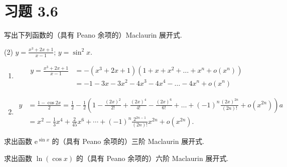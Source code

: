 \section{习题 3.6}

\begin{exercise}[3.6.1]
    写出下列函数的（具有 Peano 余项的）Maclaurin 展开式.
    \begin{tasks}(2)
        \task $y = \frac{x^3 + 2x + 1}{x - 1}$;
        \task $y = \sin^2 x$.
    \end{tasks}
\end{exercise}

\begin{solution}
    \begin{enumerate}
        \item \begin{align*}
                  y = \frac{x^3 + 2x + 1}{x - 1} & = -(x^3 + 2x + 1)(1 + x + x^2 + \dots + x^n + o(x^n))  \\
                                                 & = -1 - 3x - 3x^2 - 4x^3 - 4x^4 - \dots - 4x^n + o(x^n)
              \end{align*}
        \item \begin{align*}
                  y & = \frac{1-\cos 2x}{2} = \frac{1}{2} - \frac{1}{2}\left(1 - \frac{(2x)^2}{2!} + \frac{(2x)^4}{4!} - \frac{(2x)^6}{6!} + \dots + (-1)^n \frac{(2x)^{2n}}{(2n)!} + o(x^{2n})\right) a \\
                    & = x^2 - \frac{1}{3}x^4 + \frac{2}{45}x^6 + \cdots + (-1)^n \frac{2^{2n-1}}{(2n)!} x^{2n} + o(x^{2n}).
              \end{align*}
    \end{enumerate}
\end{solution}

\begin{exercise}[3.6.2]
    求出函数 $\mathrm{e}^{\sin x}$ 的（具有 Peano 余项的）三阶 Maclaurin 展开式.
\end{exercise}

\begin{exercise}[3.6.3]
    求出函数 $\ln(\cos x)$ 的（具有 Peano 余项的）六阶 Maclaurin 展开式.
\end{exercise}

